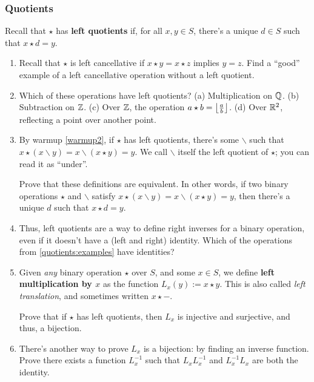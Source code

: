 \documentclass[11pt,paper=letter]{scrartcl}
\newcommand{\qunder}{\mathbin{\backslash}}
\begin{document}
\subsubsection*{Quotients}

Recall that $\star$ has \textbf{left quotients} if, for all $x, y \in S$, there's a unique $d \in S$ such that $x \star d = y$.

\begin{enumerate}
\item Recall that $\star$ is left cancellative if $x \star y = x \star z$ implies $y = z$. Find a ``good'' example of a left cancellative operation without a left quotient.

\item \label{quotients:examples} Which of these operations have left quotients? (a) Multiplication on $\mathbb Q$. (b) Subtraction on $\mathbb Z$. (c) Over $\mathbb Z$, the operation $a \star b = \left\lfloor  \frac{a}{b} \right\rfloor$. (d) Over $\mathbb R^2$, reflecting a point over another point.

\item By warmup \autoref{warmup2}, if $\star$ has left quotients, there's some $\qunder$ such that $x \star (x \qunder y) = x \qunder (x \star y) = y$. We call $\qunder$ itself the left quotient of $\star$; you can read it as ``under''.

Prove that these definitions are equivalent. In other words, if two binary operations $\star$ and $\qunder$ satisfy $x \star (x \qunder y) = x \qunder (x \star y) = y$, then there's a unique $d$ such that $x \star d = y$.

\item Thus, left quotients are a way to define right inverses for a binary operation, even if it doesn't have a (left and right) identity. Which of the operations from \autoref{quotients:examples} have identities?

\item Given \textit{any} binary operation $\star$ over $S$, and some $x \in S$, we define \textbf{left multiplication by $x$} as the function $L_x(y) := x \star y$. This is also called \textit{left translation}, and sometimes written $x \star -$.

Prove that if $\star$ has left quotients, then $L_x$ is injective and surjective, and thus, a bijection.

\item There's another way to prove $L_x$ is a bijection: by finding an inverse function. Prove there exists a function $L^{-1}_x$ such that $L_xL^{-1}_x$ and $L^{-1}_xL_x$ are both the identity.
\end{enumerate}
\end{document}
